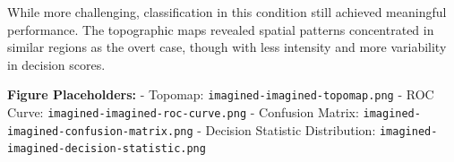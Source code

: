 \documentclass[
  letterpaper,
  DIV=11,
  numbers=noendperiod]{scrartcl}
\begin{document}
While more challenging, classification in this condition still achieved
meaningful performance. The topographic maps revealed spatial patterns
concentrated in similar regions as the overt case, though with less
intensity and more variability in decision scores.

\textbf{Figure Placeholders:} - Topomap:
\texttt{imagined-imagined-topomap.png} - ROC Curve:
\texttt{imagined-imagined-roc-curve.png} - Confusion Matrix:
\texttt{imagined-imagined-confusion-matrix.png} - Decision Statistic
Distribution: \texttt{imagined-imagined-decision-statistic.png}

\begin{figure}

\end{figure}
\end{document}
